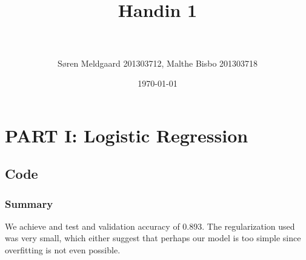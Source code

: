 \documentclass[paper=a4, fontsize=11pt]{scrartcl} %
\title{	
\normalfont \normalsize 
\horrule{0.5pt} \\[0.4cm] %
\huge Handin 1 \\ %
\horrule{2pt} \\[0.5cm] %
}
\author{S\o ren Meldgaard 201303712, Malthe Bisbo 201303718} %
\date{\normalsize\today} %
\numberwithin{equation}{section} %
\numberwithin{figure}{section} %
\numberwithin{table}{section} %
\begin{document}
\maketitle %

\section{PART I: Logistic Regression}

\subsection{Code}

\subsubsection{Summary}
We achieve and test and validation accuracy of 0.893. The regularization used was very small, which either suggest that perhaps our model is too simple since overfitting is not even possible. 
\end{document}

